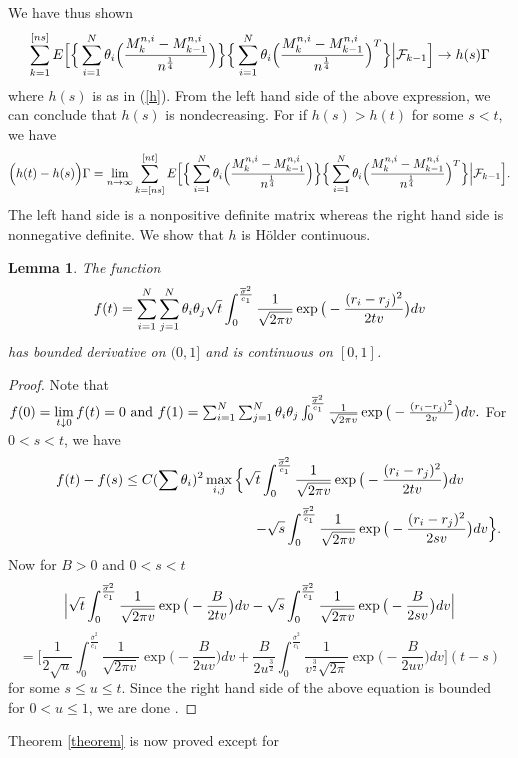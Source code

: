 \documentclass[11pt]{amsart}
\newtheorem{lemma}[theorem]{\sc Lemma}
\begin{document}
We have thus shown 
\[ \sum_{k=1}^{[ns]} E\Big{[} \Big{\lbrace} \sum_{i=1}^N\theta_i\Big{(}\frac{M_k^{n,i}-M_{k-1}^{n,i } }{n^{\frac{1}{4}} } \Big{)} \Big{\rbrace} \Big{\lbrace} \sum_{i=1}^N \theta_i\Big{(} \frac{M_k^{n,i}-M_{k-1}^{n,i} } {n^{\frac{1}{4}} }\Big{)}^T\Big{\rbrace}  \Big{\vert} \mathcal{F}_{k-1}\Big{]} \rightarrow h(s)\Gamma\]
where $h(s)$ is as in (\ref{h}). From the left hand side of the above expression, we can conclude that $h(s)$ is nondecreasing. For if $h(s)>h(t)$ for some $s<t$, we have 
\[ \Big(h(t)-h(s)\Big)\Gamma = \lim \limits_{n \to \infty}\sum_{k=[ns]}^{[nt]} E\Big{[} \Big{\lbrace} \sum_{i=1}^N\theta_i\Big{(}\frac{M_k^{n,i}-M_{k-1}^{n,i } }{n^{\frac{1}{4}} } \Big{)} \Big{\rbrace} \Big{\lbrace} \sum_{i=1}^N \theta_i\Big{(} \frac{M_k^{n,i}-M_{k-1}^{n,i} } {n^{\frac{1}{4}} }\Big{)}^T\Big{\rbrace}  \Big{\vert} \mathcal{F}_{k-1}\Big{]}.\]
The left hand side is a nonpositive definite matrix whereas the right hand side is nonnegative definite.
We show that $h$ is H\"older continuous.

\bigskip

\begin{lemma}The function
 \[f(t)=\sum_{i=1}^N\sum_{j=1}^N \theta_i \theta_j \sqrt{t} \int_{0}^{\frac{\overline{\sigma}^2}{c_1}} \frac{1}{\sqrt{2\pi v}}\exp\big{(} - \frac{(r_i-r_j)^2}{2tv}\big{)} dv  \]
has bounded derivative on $(0,1]$ and is continuous on $[0,1]$.
\end{lemma}
\begin{proof} Note that \begin{math}f(0)=\lim \limits_{ t \downarrow 0} f(t) = 0 \mbox{ and } f(1)=\sum_{i=1}^N\sum_{j=1}^N \theta_i \theta_j \int_{0}^{\frac{\overline{\sigma}^2}{c_1}} \frac{1}{\sqrt{2 \pi v}}\exp\big{(} -\frac{(r_i-r_j)^2}{2v}\big{)}dv.\end{math} For $0<s<t$, we have 
\[ f(t)-f(s) \leq C(\sum \theta_i)^2 \max_{i,j} \Big{\lbrace} \sqrt{t}\int_0^{\frac{\overline{\sigma}^2}{c_1}} \frac{1}{\sqrt{2 \pi v}} \exp\big{(} - \frac{(r_i-r_j)^2}{2tv}\big{)}dv\]
\[\hspace{6cm} - \sqrt{s}\int_0^{\frac{\overline{\sigma}^2}{c_1}}\frac{1}{\sqrt{2 \pi v}} \exp\big{(} - \frac{(r_i-r_j)^2}{2sv}\big{)}dv   \Big{\rbrace} . \]
Now for $B>0$ and $0<s<t$
\[\Big{\vert}\sqrt{t}\int_0^{\frac{\overline{\sigma}^2}{c_1}} \frac{1}{\sqrt{2 \pi v}} \exp\big{(} - \frac{B}{2tv}\big{)}dv - \sqrt{s}\int_0^{\frac{\overline{\sigma}^2}{c_1}}\frac{1}{\sqrt{2 \pi v}} \exp\big{(} - \frac{B}{2sv}\big{)}dv\Big{\vert}  \]
\[= \Big[\frac{1}{2\sqrt{u}}\int_0^{\frac{\overline{\sigma}^2}{c_1}} \frac{1}{\sqrt{2\pi v}} \exp\big( -\frac{B}{2uv} \big)dv +\frac{B}{2u^{\frac{3}{2}}}\int_0^{\frac{\overline{\sigma}^2}{c_1}} \frac{1}{v^{\frac{3}{2}}\sqrt{2 \pi}} \exp\big( -\frac{B}{2uv} \big)dv \Big] (t-s)\]
for some $s \leq u\leq t$. Since the right hand side of the above equation  is bounded for $0< u \leq 1$, we are done .
\end{proof} 
Theorem \ref{theorem} is now proved except for 
\end{document}
